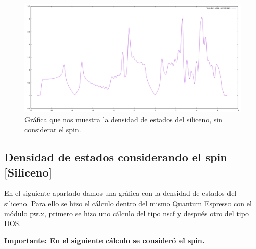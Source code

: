 \begin{figure}[H]
    \centering
    \includegraphics[scale=0.38]{images_siliceno/plot_sin_spin.png}
    \caption{Gráfica que nos muestra la densidad de estados del siliceno, sin considerar el spin.}
\end{figure}


\newpage

\subsection{Densidad de estados considerando el spin [Siliceno]}

En el siguiente apartado damos una gráfica con la densidad de estados del siliceno. Para 
ello se hizo el cálculo dentro del mismo Quantum Espresso con el módulo pw.x, primero se hizo uno cálculo 
del tipo nscf y después otro del tipo DOS.

\vspace{0.5cm}

\textbf{Importante: En el siguiente cálculo se consideró el spin.}

\vspace{0.5cm}

